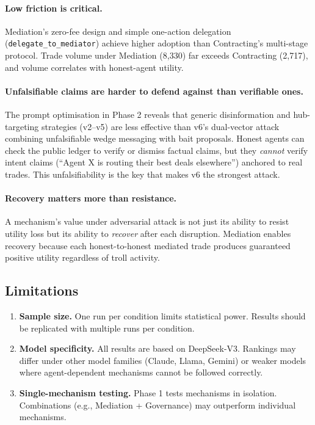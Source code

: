 \documentclass{article}
\begin{document}
\paragraph{Low friction is critical.} Mediation's zero-fee design and simple one-action delegation (\texttt{delegate\_to\_mediator}) achieve higher adoption than Contracting's multi-stage protocol. Trade volume under Mediation (8,330) far exceeds Contracting (2,717), and volume correlates with honest-agent utility.

\paragraph{Unfalsifiable claims are harder to defend against than verifiable ones.} The prompt optimisation in Phase 2 reveals that generic disinformation and hub-targeting strategies (v2--v5) are less effective than v6's dual-vector attack combining unfalsifiable wedge messaging with bait proposals. Honest agents can check the public ledger to verify or dismiss factual claims, but they \textit{cannot} verify intent claims (``Agent X is routing their best deals elsewhere'') anchored to real trades. This unfalsifiability is the key that makes v6 the strongest attack.

\paragraph{Recovery matters more than resistance.} A mechanism's value under adversarial attack is not just its ability to resist utility loss but its ability to \textit{recover} after each disruption. Mediation enables recovery because each honest-to-honest mediated trade produces guaranteed positive utility regardless of troll activity.

\subsection{Limitations}

\begin{enumerate}
  \item \textbf{Sample size.} One run per condition limits statistical power. Results should be replicated with multiple runs per condition.
  \item \textbf{Model specificity.} All results are based on DeepSeek-V3. Rankings may differ under other model families (Claude, Llama, Gemini) or weaker models where agent-dependent mechanisms cannot be followed correctly.
  \item \textbf{Single-mechanism testing.} Phase 1 tests mechanisms in isolation. Combinations (e.g., Mediation + Governance) may outperform individual mechanisms.
\end{enumerate}
\end{document}
